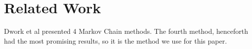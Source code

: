 \section{Related Work}
Dwork et al presented 4 Markov Chain methods. The fourth method, henceforth \MC had the most promising results, so it is the method we use for this paper.\cite{rank:aggregation}


